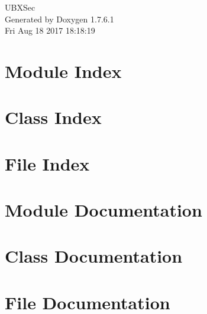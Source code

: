 \documentclass[a4paper]{book}
\begin{document}
\hypersetup{pageanchor=false,citecolor=blue}
\begin{titlepage}
\vspace*{7cm}
\begin{center}
{\Large \-U\-B\-X\-Sec }\\
\vspace*{1cm}
{\large \-Generated by Doxygen 1.7.6.1}\\
\vspace*{0.5cm}
{\small Fri Aug 18 2017 18:18:19}\\
\end{center}
\end{titlepage}
\clearemptydoublepage
{}
\tableofcontents
\clearemptydoublepage
{}
\hypersetup{pageanchor=true,citecolor=blue}
\chapter{\-Module \-Index}

\chapter{\-Class \-Index}

\chapter{\-File \-Index}

\chapter{\-Module \-Documentation}

\chapter{\-Class \-Documentation}




















\chapter{\-File \-Documentation}




\printindex
\end{document}
